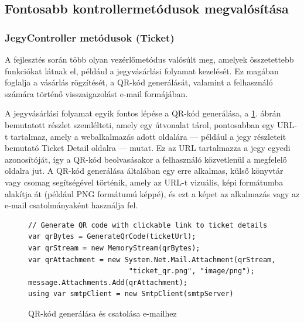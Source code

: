 \subsection{Fontosabb kontrollermetódusok megvalósítása}
\subsubsection{JegyController metódusok (Ticket)}
A fejlesztés során több olyan vezérlőmetódus valósúlt meg, amelyek összetettebb funkciókat látnak el, például a jegyvásárlási folyamat kezelését. Ez magában foglalja a vásárlás rögzítését, a QR-kód generálását, valamint a felhasználó számára történő visszaigazolást e-mail formájában.

A jegyvásárlási folyamat egyik fontos lépése a QR-kód generálása, a \ref{fig:attach-qr-send-email}. ábrán bemutatott részlet szemlélteti, amely egy útvonalat tárol, pontosabban egy URL-t tartalmaz, amely a webalkalmazás adott oldalára — például a jegy részleteit bemutató Ticket Detail oldalra — mutat. Ez az URL tartalmazza a jegy egyedi azonosítóját, így a QR-kód beolvasásakor a felhasználó közvetlenül a megfelelő oldalra jut. A QR-kód generálása általában egy erre alkalmas, külső könyvtár vagy csomag segítségével történik, amely az URL-t vizuális, képi formátumba alakítja át (például PNG formátumú képpé), és ezt a képet az alkalmazás vagy az e-mail csatolmányaként használja fel.

\begin{figure}[H]
\caption{QR-kód generálása és csatolása e-mailhez }
\label{fig:attach-qr-send-email}
\begin{minipage}{\textwidth}
\begin{BVerbatim}
// Generate QR code with clickable link to ticket details
var qrBytes = GenerateQrCode(ticketUrl);
var qrStream = new MemoryStream(qrBytes);
var qrAttachment = new System.Net.Mail.Attachment(qrStream,
                        "ticket_qr.png", "image/png");
message.Attachments.Add(qrAttachment);
using var smtpClient = new SmtpClient(smtpServer)

\end{BVerbatim}
\end{minipage}
\end{figure}

